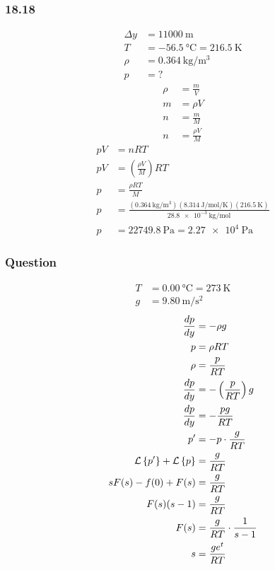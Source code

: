 \documentclass{article}
\begin{document}
\subsubsection{18.18}

\begin{align*}
	\Delta y & = \SI{11000}{\meter} \\
	T & = \SI{-56.5}{\celsius} = \SI{216.5}{\kelvin} \\
	\rho & = \SI{0.364}{\kilogram \per \meter \cubed} \\
	p & = ?
\end{align*}
\begin{align*}
	\rho & = \frac{ m }{ V } \\
	m & = \rho V \\
	n & = \frac{ m }{ M } \\
	n & = \frac{ \rho V }{ M }
\end{align*}
\begin{align*}
	pV & = nRT \\
	pV & = \left( \frac{ \rho V }{ M } \right) RT \\
	p & = \frac{ \rho RT }{ M } \\
	p & = \frac{ (\SI{0.364}{\kilogram \per \meter \cubed})(\SI{8.314}{\joule \per \mole \per \kelvin})(\SI{216.5}{\kelvin}) }{ \SI{28.8e-3}{\kilogram \per \mole} } \\
	p & = \SI{22749.8}{\pascal} = \SI{2.27e4}{\pascal}
\end{align*}

\subsubsection{Question}

\begin{align*}
	T & = \SI{0.00}{\celsius} = \SI{273}{\kelvin} \\
	g & = \SI{9.80}{\meter \per \second \squared}
\end{align*}
\begin{align*}
	\frac{ dp }{ dy } & = -\rho g \\
	p & = \rho RT \\
	\rho & = \frac{ p }{ RT } \\
	\frac{ dp }{ dy } & = - \left( \frac{ p }{ RT } \right)g \\
	\frac{ dp }{ dy } & = -\frac{ pg }{ RT } \\
	p' & = -p \cdot \frac{ g }{ RT } \\
	\lap[p'] + \lap[p] & = \frac{ g }{ RT } \\
	sF(s) - f(0) + F(s) & = \frac{ g }{ RT } \\
	F(s)(s - 1) & = \frac{ g }{ RT } \\
	F(s) & = \frac{ g }{ RT } \cdot \frac{ 1 }{ s - 1 } \\
	s & = \frac{ ge^t }{ RT }
\end{align*}
\end{document}

